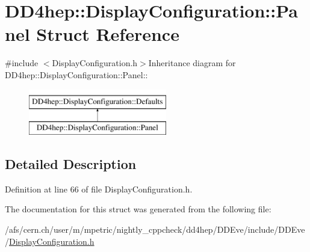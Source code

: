 \hypertarget{struct_d_d4hep_1_1_display_configuration_1_1_panel}{
\section{DD4hep::DisplayConfiguration::Panel Struct Reference}
\label{struct_d_d4hep_1_1_display_configuration_1_1_panel}
}


{\ttfamily \#include $<$DisplayConfiguration.h$>$}Inheritance diagram for DD4hep::DisplayConfiguration::Panel::\begin{figure}[H]
\begin{center}
\leavevmode
\includegraphics[height=2cm]{struct_d_d4hep_1_1_display_configuration_1_1_panel}
\end{center}
\end{figure}


\subsection{Detailed Description}


Definition at line 66 of file DisplayConfiguration.h.

The documentation for this struct was generated from the following file:\begin{DoxyCompactItemize}
\item 
/afs/cern.ch/user/m/mpetric/nightly\_\-cppcheck/dd4hep/DDEve/include/DDEve/\hyperlink{_display_configuration_8h}{DisplayConfiguration.h}\end{DoxyCompactItemize}
